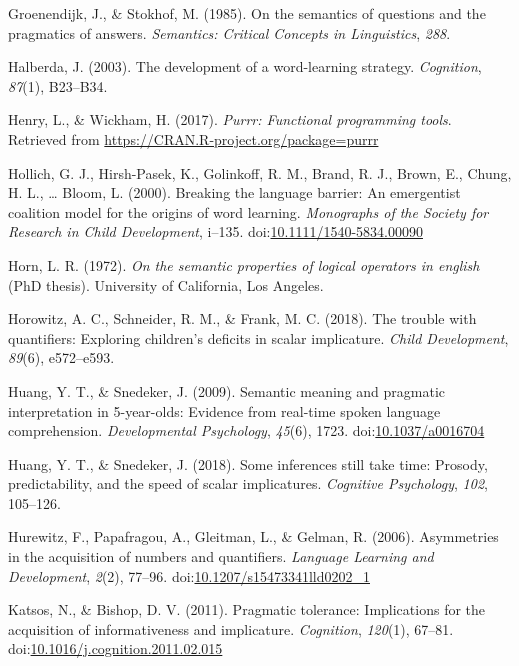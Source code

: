\documentclass[man]{apa6}
\begin{document}
\hypertarget{ref-groenendijk1985semantics}{}
Groenendijk, J., \& Stokhof, M. (1985). On the semantics of questions
and the pragmatics of answers. \emph{Semantics: Critical Concepts in
Linguistics}, \emph{288}.

\hypertarget{ref-halberda2003development}{}
Halberda, J. (2003). The development of a word-learning strategy.
\emph{Cognition}, \emph{87}(1), B23--B34.

\hypertarget{ref-R-purrr}{}
Henry, L., \& Wickham, H. (2017). \emph{Purrr: Functional programming
tools}. Retrieved from \url{https://CRAN.R-project.org/package=purrr}

\hypertarget{ref-hollich2000}{}
Hollich, G. J., Hirsh-Pasek, K., Golinkoff, R. M., Brand, R. J., Brown,
E., Chung, H. L., \ldots{} Bloom, L. (2000). Breaking the language
barrier: An emergentist coalition model for the origins of word
learning. \emph{Monographs of the Society for Research in Child
Development}, i--135.
doi:\href{https://doi.org/10.1111/1540-5834.00090}{10.1111/1540-5834.00090}

\hypertarget{ref-horn1972}{}
Horn, L. R. (1972). \emph{On the semantic properties of logical
operators in english} (PhD thesis). University of California, Los
Angeles.

\hypertarget{ref-horowitz2018}{}
Horowitz, A. C., Schneider, R. M., \& Frank, M. C. (2018). The trouble
with quantifiers: Exploring children's deficits in scalar implicature.
\emph{Child Development}, \emph{89}(6), e572--e593.

\hypertarget{ref-huang2009b}{}
Huang, Y. T., \& Snedeker, J. (2009). Semantic meaning and pragmatic
interpretation in 5-year-olds: Evidence from real-time spoken language
comprehension. \emph{Developmental Psychology}, \emph{45}(6), 1723.
doi:\href{https://doi.org/10.1037/a0016704}{10.1037/a0016704}

\hypertarget{ref-huang2018}{}
Huang, Y. T., \& Snedeker, J. (2018). Some inferences still take time:
Prosody, predictability, and the speed of scalar implicatures.
\emph{Cognitive Psychology}, \emph{102}, 105--126.

\hypertarget{ref-hurewitz2006}{}
Hurewitz, F., Papafragou, A., Gleitman, L., \& Gelman, R. (2006).
Asymmetries in the acquisition of numbers and quantifiers.
\emph{Language Learning and Development}, \emph{2}(2), 77--96.
doi:\href{https://doi.org/10.1207/s15473341lld0202_1}{10.1207/s15473341lld0202\_1}

\hypertarget{ref-katsos2011}{}
Katsos, N., \& Bishop, D. V. (2011). Pragmatic tolerance: Implications
for the acquisition of informativeness and implicature.
\emph{Cognition}, \emph{120}(1), 67--81.
doi:\href{https://doi.org/10.1016/j.cognition.2011.02.015}{10.1016/j.cognition.2011.02.015}
\end{document}
